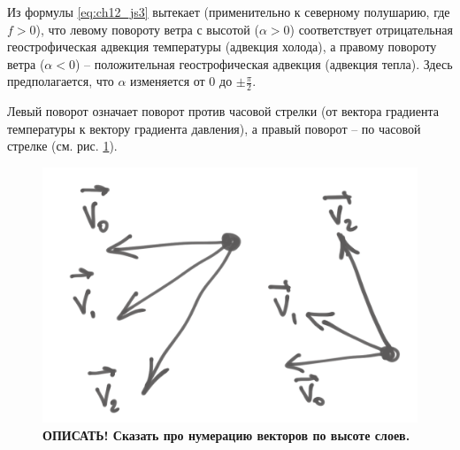 Из формулы \ref{eq:ch12_js3} вытекает (применительно к северному полушарию, где $f>0$), что левому повороту ветра с высотой ($\alpha>0$) соответствует отрицательная геострофическая адвекция температуры (адвекция холода), а правому повороту ветра ($\alpha<0$) --  положительная геострофическая адвекция (адвекция тепла). Здесь предполагается, что $\alpha$ изменяется от $0$ до $\pm\frac{\pi}{2}$.

Левый поворот означает поворот против часовой стрелки (от вектора градиента температуры к вектору градиента давления), а правый поворот -- по часовой стрелке (см. рис. \ref{fig:ch12.2}).

    \begin{figure}[h]
    \centering
    \includegraphics[width=0.5\linewidth]{pics/ch12.2.png}
    \caption{\label{fig:ch12.2}
    {\color{red} \textbf{ОПИСАТЬ! Сказать про нумерацию векторов по высоте слоев.}}
    }
    \end{figure}    

